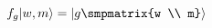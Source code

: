 \begin{equation}
\label{eq:fgwm}
  f_g \lvert w,m \rangle = \lvert g \smpmatrix{w \\ m} \rangle
\end{equation}

